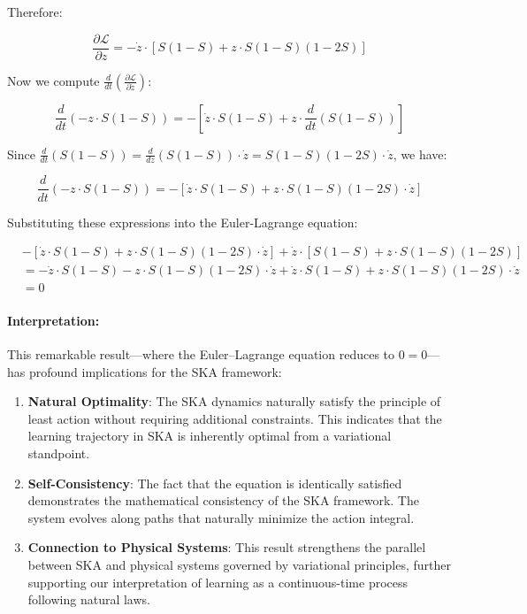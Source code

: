 \documentclass{article}
\begin{document}
Therefore:

\begin{equation}
	\frac{\partial \mathcal{L}}{\partial z} = -\dot{z} \cdot \left[S(1 - S) + z \cdot S(1 - S)(1 - 2S)\right]
\end{equation}

Now we compute $\frac{d}{dt}\left(\frac{\partial \mathcal{L}}{\partial \dot{z}}\right)$:

\begin{equation}
	\frac{d}{dt}\left(-z \cdot S(1 - S)\right) = -\left[\dot{z} \cdot S(1 - S) + z \cdot \frac{d}{dt}(S(1 - S))\right]
\end{equation}

Since $\frac{d}{dt}(S(1 - S)) = \frac{d}{dz}(S(1 - S)) \cdot \dot{z} = S(1 - S)(1 - 2S) \cdot \dot{z}$, we have:

\begin{equation}
	\frac{d}{dt}\left(-z \cdot S(1 - S)\right) = -\left[\dot{z} \cdot S(1 - S) + z \cdot S(1 - S)(1 - 2S) \cdot \dot{z}\right]
\end{equation}

Substituting these expressions into the Euler-Lagrange equation:

\begin{align}
	&-\left[\dot{z} \cdot S(1 - S) + z \cdot S(1 - S)(1 - 2S) \cdot \dot{z}\right] + \dot{z} \cdot \left[S(1 - S) + z \cdot S(1 - S)(1 - 2S)\right]\\
	&= -\dot{z} \cdot S(1 - S) - z \cdot S(1 - S)(1 - 2S) \cdot \dot{z} + \dot{z} \cdot S(1 - S) + z \cdot S(1 - S)(1 - 2S) \cdot \dot{z}\\
	&= 0
\end{align}

\paragraph{Interpretation:}
This remarkable result—where the Euler–Lagrange equation reduces to $0=0$—has profound implications for the SKA framework:

\begin{enumerate}
	\item \textbf{Natural Optimality}: The SKA dynamics naturally satisfy the principle of least action without requiring additional constraints. This indicates that the learning trajectory in SKA is inherently optimal from a
variational standpoint.
	
	\item \textbf{Self-Consistency}: The fact that the equation is identically satisfied demonstrates the mathematical consistency of the SKA framework. The system evolves along paths that naturally minimize the action integral.
	
	\item \textbf{Connection to Physical Systems}: This result strengthens the parallel between SKA and physical systems governed by variational principles, further supporting our interpretation of learning as a continuous-time process following natural laws.
\end{enumerate}
\end{document}

